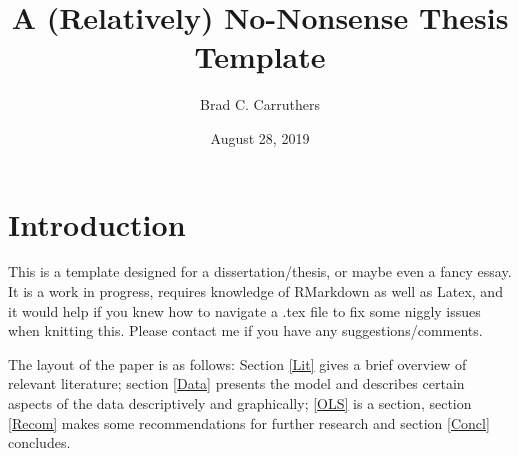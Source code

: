 \documentclass[12pt,preprint, authoryear]{article}
\title{A (Relatively) No-Nonsense Thesis Template}
\author{Brad C. Carruthers}
\date{August 28, 2019}
\numberwithin{equation}{section}
\numberwithin{figure}{section}
\numberwithin{table}{section}
\begin{document}
\pagestyle{fancy}
\chead{}
\rhead{}
\lfoot{}
\rfoot{} 
\lhead{}
\cfoot{\footnotesize \thepage\\}







\maketitle
\thispagestyle{empty}




\clearpage

\setcounter{page}{1}

\renewcommand{\contentsname}{Contents}
\hypersetup{linkcolor=black}
\tableofcontents
\newpage
\hypersetup{linkcolor=black}
\listoftables
\newpage
\hypersetup{linkcolor=black}
\listoffigures
\hypersetup{linkcolor=black}
\newpage


\renewcommand{\vec}[1]{\mathbf{#1}}

\section{\texorpdfstring{Introduction
\label{Intro}}{Introduction }}\label{introduction}

This is a template designed for a dissertation/thesis, or maybe even a
fancy essay. It is a work in progress, requires knowledge of RMarkdown
as well as Latex, and it would help if you knew how to navigate a .tex
file to fix some niggly issues when knitting this. Please contact me if
you have any suggestions/comments.

The layout of the paper is as follows: Section \ref{Lit} gives a brief
overview of relevant literature; section \ref{Data} presents the model
and describes certain aspects of the data descriptively and graphically;
\ref{OLS} is a section, section \ref{Recom} makes some recommendations
for further research and section \ref{Concl} concludes.
\end{document}

